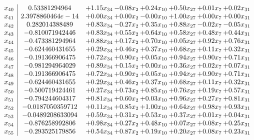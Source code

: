 \documentclass[8pt]{article}
\begin{document}
\[\begin{array}{c| c c@{\hskip 2pt} c@{\hskip 2pt} c@{\hskip 2pt} c@{\hskip 2pt} c@{\hskip 2pt} c@{\hskip 2pt} }
 x_{40}   &  0.53381294964 & +  1.15 x_{34} & -0.08 x_{2} & +  0.24 x_{10} & +  0.50 x_{27} & +  0.01 x_{7} & +  0.02 x_{31}\\
 x_{41}   &  2.3978860464e-14 & +  0.00 x_{34} & +  0.00 x_{2} & -0.00 x_{10} & +  1.00 x_{27} & +  0.00 x_{7} & +  0.00 x_{31}\\
 x_{42}   &  0.282014388489 & +  0.83 x_{34} & -0.27 x_{2} & +  0.35 x_{10} & +  0.88 x_{27} & -0.02 x_{7} & -0.05 x_{31}\\
 x_{43}   &  -0.810071942446 & +  0.83 x_{34} & +  0.55 x_{2} & +  0.64 x_{10} & +  0.58 x_{27} & +  0.48 x_{7} & +  0.44 x_{31}\\
 x_{44}   &  -0.473381294964 & +  0.88 x_{34} & +  0.17 x_{2} & +  0.70 x_{10} & +  0.05 x_{27} & +  0.92 x_{7} & +  0.76 x_{31}\\
 x_{45}   &  -0.624460431655 & +  0.29 x_{34} & +  0.46 x_{2} & +  0.37 x_{10} & +  0.68 x_{27} & +  0.11 x_{7} & +  0.32 x_{31}\\
 x_{46}   &  -0.191366906475 & +  0.72 x_{34} & +  0.90 x_{2} & +  0.05 x_{10} & +  0.94 x_{27} & +  0.90 x_{7} & +  0.71 x_{31}\\
 x_{47}   &  -0.981294964029 & +  0.89 x_{34} & +  0.15 x_{2} & +  0.00 x_{10} & +  0.36 x_{27} & +  0.02 x_{7} & +  0.07 x_{31}\\
 x_{48}   &  -0.191366906475 & +  0.72 x_{34} & +  0.90 x_{2} & +  0.05 x_{10} & +  0.94 x_{27} & +  0.90 x_{7} & +  0.71 x_{31}\\
 x_{49}   &  -0.624460431655 & +  0.29 x_{34} & +  0.46 x_{2} & +  0.37 x_{10} & +  0.68 x_{27} & +  0.11 x_{7} & +  0.32 x_{31}\\
 x_{50}   &  -0.500719424461 & +  0.27 x_{34} & +  0.73 x_{2} & +  0.85 x_{10} & +  0.76 x_{27} & +  0.19 x_{7} & +  0.57 x_{31}\\
 x_{51}   &  -0.794244604317 & +  0.81 x_{34} & +  0.60 x_{2} & +  0.03 x_{10} & +  0.96 x_{27} & +  0.27 x_{7} & +  0.81 x_{31}\\
 x_{52}   &  -0.0187050359712 & +  0.11 x_{34} & +  0.85 x_{2} & +  1.00 x_{10} & +  0.64 x_{27} & +  0.98 x_{7} & +  0.93 x_{31}\\
 x_{53}   &  -0.0489208633094 & +  0.59 x_{34} & +  0.31 x_{2} & +  0.53 x_{10} & +  0.37 x_{27} & +  0.01 x_{7} & +  0.04 x_{31}\\
 x_{54}   &  -0.876258992806 & +  0.98 x_{34} & +  0.27 x_{2} & +  0.48 x_{10} & +  0.07 x_{27} & +  0.08 x_{7} & +  0.25 x_{31}\\
 x_{55}   &  -0.293525179856 & +  0.54 x_{34} & +  0.87 x_{2} & +  0.19 x_{10} & +  0.20 x_{27} & +  0.08 x_{7} & +  0.23 x_{31}\\

\end{array}\]
\end{document}
